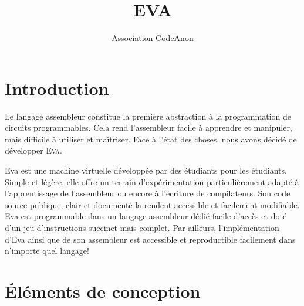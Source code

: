 \documentclass[11pt,twoside,french]{article}
\newcommand{\noun}[1]{\textsc{#1}}
\begin{document}
\title{EVA}
\author{Association CodeAnon}

\maketitle
\clearpage{}

\tableofcontents{}

\cleardoublepage{}

\vfill{}


\section{Introduction}

Le langage assembleur constitue la première abstraction à la programmation
de circuits programmables. Cela rend l'assembleur facile à apprendre
et manipuler, mais difficile à utiliser et maîtriser. Face à l'état
des choses, nous avons décidé de développer \noun{Eva}.

Eva est une machine virtuelle développée par des étudiants pour les
étudiants. Simple et légère, elle offre un terrain d'expérimentation
particulièrement adapté à l'apprentissage de l'assembleur ou encore
à l'écriture de compilateurs. Son code source publique, clair et documenté
la rendent accessible et facilement modifiable. Eva est programmable
dans un langage assembleur dédié facile d'accès et doté d'un jeu d'instructions
succinct mais complet. Par ailleurs, l'implémentation d'Eva ainsi
que de son assembleur est accessible et reproductible facilement dans
n'importe quel langage!

\vfill{}
\newpage{}

\section{Éléments de conception}
\end{document}
